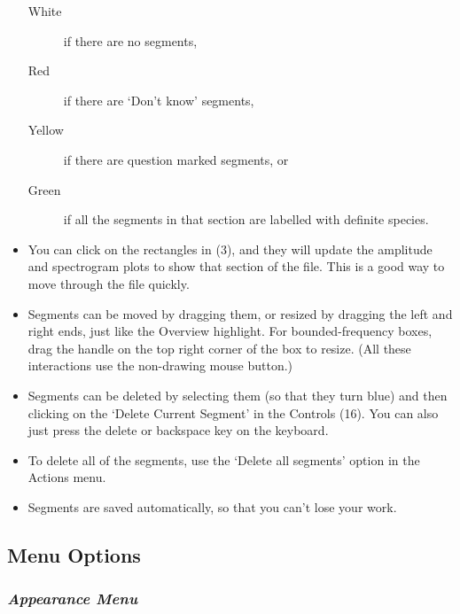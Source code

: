 \documentclass{article}
\begin{document}
\begin{itemize}
	\begin{description} 
 	\item[White] if there are no segments, 
	\item[Red] if there are `Don't know' segments, 
	\item[Yellow] if there are question marked segments, or 
	\item[Green] if all the segments in that section are labelled with definite species. 
	\end{description}
	
\item You can click on the rectangles in (3), and they will update the amplitude and spectrogram plots to show that section of the file. This is a good way to move through the file quickly.

\item Segments can be moved by dragging them, or resized by dragging the left and right ends, just like the Overview highlight. For bounded-frequency boxes, drag the handle on the top right corner of the box to resize. (All these interactions use the non-drawing mouse button.)

\item Segments can be deleted by selecting them (so that they turn blue) and then clicking on the `Delete Current Segment' in the Controls (16). You can also just press the delete or backspace key on the keyboard. 

\item To delete all of the segments, use the `Delete all segments' option in the Actions menu. 

\item Segments are saved automatically, so that you can't lose your work.

\end{itemize}

\subsection{Menu Options}	

\subsubsection{{\em Appearance Menu}}
\end{document}
